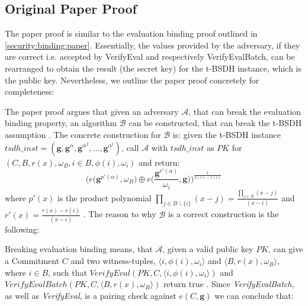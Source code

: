\subsection*{Original Paper Proof}
The paper proof is similar to the evaluation binding proof outlined in \ref{security:binding:paper}. Essentially, the values provided by the adversary, if they are correct i.e. accepted by VerifyEval and respectively VerifyEvalBatch, can be rearranged to obtain the result (the secret key) for the t-BSDH instance, which is the public key. Nevertheless, we outline the paper proof concretely for completeness:

The paper proof argues that given an adversary $\mathcal{A}$, that can break the evaluation binding property, an algorithm $\mathcal{B}$ can be constructed, that can break the t-BSDH assumption \parencite{KZG}. The concrete construction for $\mathcal{B}$ is: given the t-BSDH instance $tsdh\_inst =(\mathbf{g}, \mathbf{g}^{\alpha}, \mathbf{g}^{\alpha^2},\dots, \mathbf{g}^{\alpha^t})$, call $\mathcal{A}$ with $tsdh\_inst$ as $PK$ for $(C,B, r(x), \omega_B, i \in B,\phi(i),\omega_i)$ and return: 
$$ \biggl(e\biggl(\mathbf{g}^{p'(\alpha)}, \omega_B\biggr) \oplus e\biggl(\frac{\mathbf{g}^{r'(\alpha)}}{\omega_i}, \mathbf{g}\biggr)\biggr)^{\frac{1}{\phi(i)-r(i)}}$$
where $p'(x)$ is the product polynomial $\prod_{j\in B\backslash\{i\}}^{}(x-j) = \frac{\prod_{j\in B}^{}(x-j)}{(x-i)}$ and $r'(x)=\frac{r(x)-r(i)}{(x-i)}$ \parencite{KZG}.
The reason to why $\mathcal{B}$ is a correct construction is the following: 

Breaking evaluation binding means, that $\mathcal{A}$, given a valid public key $PK$, can give a Commitment $C$ and two witness-tuples, $\langle i, \phi(i),\omega_i\rangle$ and $\langle B, r(x), \omega_B\rangle$, where $i \in B$, such that $VerifyEval(PK, C,\langle i,\phi(i), \omega_i\rangle )$ and $VerifyEvalBatch(PK, C,\langle B,r(x), \omega_B\rangle )$ return true \parencite{KZG}. Since \textit{VerifyEvalBatch}, as well as \textit{VerifyEval}, is a pairing check against $e(C,\mathbf{g})$ we can conclude that: 

